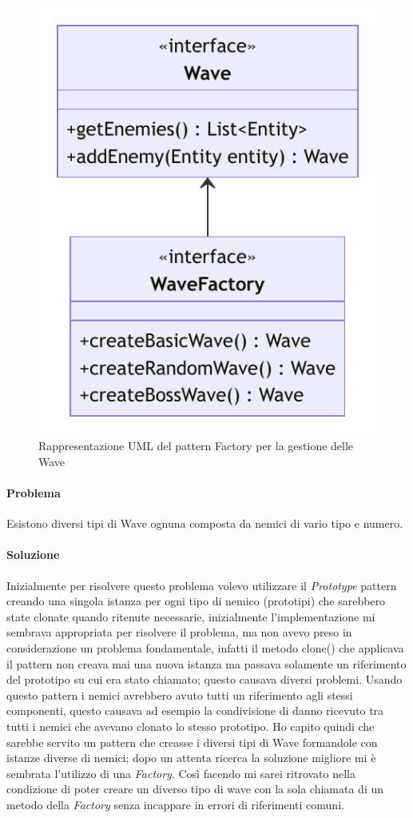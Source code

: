 \documentclass[a4paper,12pt]{report}
\begin{document}
\begin{figure}[H]
\centering{}
\includegraphics[scale=0.75]{img/WaveUML}
\caption{Rappresentazione UML del pattern Factory per la gestione delle Wave}
\label{img:wave}
\end{figure}

\paragraph{Problema} Esistono diversi tipi di Wave ognuna composta da nemici di vario tipo e numero.

\paragraph{Soluzione} Inizialmente per risolvere questo problema volevo utilizzare il \textit{Prototype} pattern creando una singola istanza per ogni tipo di nemico (prototipi) che sarebbero state clonate quando ritenute necessarie, inizialmente l’implementazione mi sembrava appropriata per risolvere il problema, ma non avevo preso in considerazione un problema fondamentale, infatti il metodo clone() che applicava il pattern non creava mai una nuova istanza ma passava solamente un riferimento del prototipo su cui era stato chiamato; questo causava diversi problemi. Usando questo pattern i nemici avrebbero avuto tutti un riferimento agli stessi componenti, questo causava ad esempio la condivisione di danno ricevuto tra tutti i nemici che avevano clonato lo stesso prototipo.
Ho capito quindi che sarebbe servito un pattern che creasse i diversi tipi di Wave formandole con istanze diverse di nemici; dopo un attenta ricerca la soluzione migliore mi è sembrata l’utilizzo di una \textit{Factory}. Così facendo mi sarei ritrovato nella condizione di poter creare un diverso tipo di wave con la sola chiamata di un metodo della \textit{Factory} senza incappare in errori di riferimenti comuni.
\end{document}
